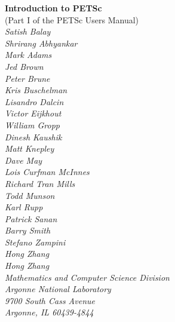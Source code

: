%
%
%
%


\def\design{\medskip \noindent Design Issue:\begin{em}}
\def\enddesign{\end{em} \medskip}


\def\shortintro{*}
\renewcommand{\cite}[1]{}
\def\thesection {$\!\!\!\!$}

\usepackage{fancyhdr,lastpage}
\pagestyle{fancy}



\begin{center}
$\!$
\vspace{1.0cm}
\thispagestyle{empty}

{\huge \bf Introduction to PETSc}\\
\vspace{0.5cm}
{\LARGE (Part I of the PETSc Users Manual)} \\
\vspace{1.5cm}
{\large \em Satish Balay\\Shrirang Abhyankar\\Mark Adams\\Jed Brown\\Peter Brune\\Kris Buschelman\\Lisandro Dalcin\\Victor Eijkhout\\William Gropp\\Dinesh Kaushik\\Matt Knepley\\Dave May\\Lois Curfman McInnes\\Richard Tran Mills\\Todd Munson\\Karl Rupp\\Patrick Sanan\\Barry Smith\\Stefano Zampini\\Hong Zhang\\Hong Zhang\\
\medskip \medskip
Mathematics and Computer Science Division\\
Argonne National Laboratory\\
9700 South Cass Avenue\\
Argonne, IL 60439-4844\\
}
\end{center}

